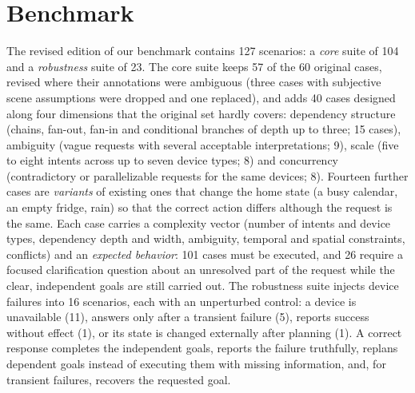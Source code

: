 \documentclass[a4paper,11pt]{article}
\begin{document}
\section{Benchmark}
\label{sec:benchmark}

The revised edition of our benchmark contains 127 scenarios: a \emph{core} suite of 104 and a
\emph{robustness} suite of 23. The core suite keeps 57 of the 60 original cases, revised where
their annotations were ambiguous (three cases with subjective scene assumptions were dropped and
one replaced), and adds 40 cases designed along four dimensions that the original set hardly
covers: dependency structure (chains, fan-out, fan-in and conditional branches of depth up to
three; 15 cases), ambiguity (vague requests with several acceptable interpretations; 9),
scale (five to eight intents across up to seven device types; 8) and concurrency
(contradictory or parallelizable requests for the same devices; 8). Fourteen further cases are
\emph{variants} of existing ones that change the home state (a busy calendar, an empty fridge,
rain) so that the correct action differs although the request is the same. Each case carries a
complexity vector (number of intents and device types, dependency depth and width, ambiguity,
temporal and spatial constraints, conflicts) and an \emph{expected behavior}: 101 cases must be
executed, and 26 require a focused clarification question about an unresolved part of the
request while the clear, independent goals are still carried out. The robustness suite injects
device failures into 16 scenarios, each with an unperturbed control: a device is unavailable
(11), answers only after a transient failure (5), reports success without effect (1), or its
state is changed externally after planning (1). A correct response completes the independent
goals, reports the failure truthfully, replans dependent goals instead of executing them with
missing information, and, for transient failures, recovers the requested goal.
\end{document}
